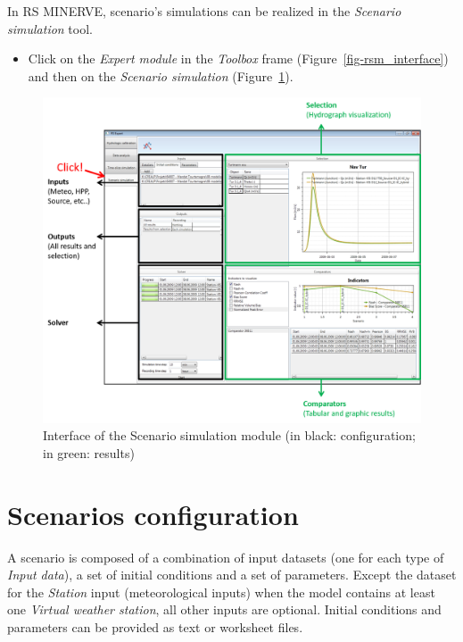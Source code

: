 \documentclass[
  letterpaper,
  DIV=11,
  numbers=noendperiod]{scrreprt}
\providecommand{\tightlist}{%
  \setlength{\itemsep}{0pt}\setlength{\parskip}{0pt}}\usepackage{longtable,booktabs,array}
\begin{document}
In RS MINERVE, scenario's simulations can be realized in the
\emph{Scenario simulation} tool.

\begin{itemize}
\tightlist
\item
  {Click on the \emph{Expert module} in the \emph{Toolbox} frame
  (Figure~\ref{fig-rsm_interface}) and then on the \emph{Scenario
  simulation} (Figure~\ref{fig-scenario_simulation_interface}).}
\end{itemize}

\begin{figure}

{\centering \includegraphics{./figures/fig-scenario_simulation_interface.png}

}

\caption{\label{fig-scenario_simulation_interface}Interface of the
Scenario simulation module (in black: configuration; in green: results)}

\end{figure}

\hypertarget{scenarios-configuration}{%
\section{Scenarios configuration}\label{scenarios-configuration}}

A scenario is composed of a combination of input datasets (one for each
type of \emph{Input data}), a set of initial conditions and a set of
parameters. Except the dataset for the \emph{Station} input
(meteorological inputs) when the model contains at least one
\emph{Virtual weather station}, all other inputs are optional. Initial
conditions and parameters can be provided as text or worksheet files.
\end{document}
